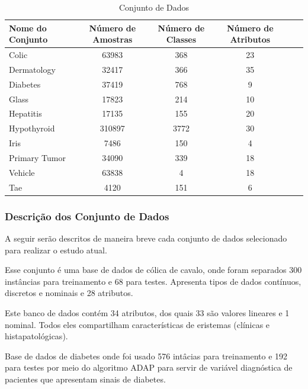\documentclass[12pt]{article}
\begin{document}
\begin{table}[h]

	\centering
	\caption{Conjunto de Dados}
	\label{tabelaConjuntoDados}
	\begin{tabular}{lccccc}
		\hline
		Nome do Conjunto & Número de Amostras & Número de Classes & Número de Atributos \\ \hline
		Colic  & 63983    & 368  & 23    \\ \hline
		Dermatology  & 32417    & 366  & 35    \\ \hline
		Diabetes  & 37419    & 768  & 9    \\ \hline
		Glass  & 17823    & 214  & 10    \\ \hline
		Hepatitis  & 17135    & 155  & 20    \\ \hline
		Hypothyroid  & 310897    & 3772  & 30    \\ \hline
		Iris  & 7486    & 150  & 4    \\ \hline
		Primary Tumor  & 34090    & 339  & 18    \\ \hline
		Vehicle  & 63838    & 4  & 18    \\ \hline
		Tae  & 4120    & 151  & 6    \\ \hline
	\end{tabular}
\end{table}

\subsubsection{Descrição dos Conjunto de Dados} \label{sec:descricaodataset}

A seguir serão descritos de maneira breve cada conjunto de dados selecionado para realizar o estudo atual.

 \label{sec:colic}

Esse conjunto é uma base de dados de cólica de cavalo, onde foram separados 300 instâncias para treinamento e 68 para testes. Apresenta tipos de dados contínuos, discretos e nominais e 28 atributos.

 \label{sec:derma}

Este banco de dados contém 34 atributos, dos quais 33 são valores lineares  e 1 nominal. Todos eles compartilham características de eristemas (clínicas e histapatológicas).

 \label{sec:diabetes}

Base de dados de diabetes onde foi usado 576 intâcias para treinamento e 192 para testes por meio do algoritmo ADAP para servir de variável diagnóstica de pacientes que apresentam sinais de diabetes.
\end{document}
